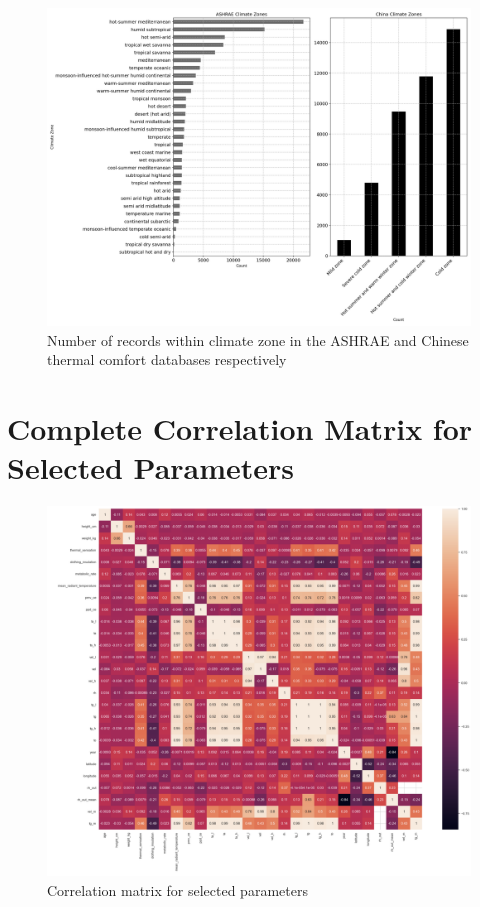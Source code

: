 \documentclass[final,3p,times,12pt]{elsarticle}
\begin{document}
\begin{figure}
    \centering
    \includegraphics[width=1.0\linewidth]{climate_records.png}
    \caption{Number of records within climate zone in the ASHRAE and Chinese thermal comfort databases respectively}
    \label{fig:czrecords}
\end{figure}

\clearpage
\section{Complete Correlation Matrix for Selected Parameters}
\begin{figure}[h!]
    \centering
    \includegraphics[width=1.0\linewidth]{correlation matrix.png}
    \caption{Correlation matrix for selected parameters}
    \label{correlation}
\end{figure}

 
\clearpage

\end{document}
